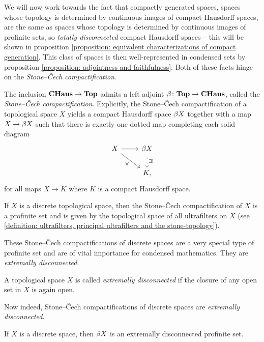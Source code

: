We will now work towards the fact that compactly generated spaces, \ie spaces whose topology is determined by continuous images of compact Hausdorff spaces, are the same as spaces whose topology is determined by continuous images of profinite sets, so \emph{totally disconnected} compact Hausdorff spaces -- this will be shown in proposition \ref{proposition: equivalent characterizations of compact generation}. This class of spaces is then well-represented in condensed sets by proposition \ref{proposition: adjointness and faithfulness}. Both of these facts hinge on the \emph{Stone--\v Cech compactification}.
\begin{proposition}
	\label{proposition: stone-cech compactification}
	
	The inclusion ${{\mathbf{CHaus}}} \to {{\mathbf{Top}}}$ admits a left adjoint ${\beta}\colon {{\mathbf{Top}}} \to {{\mathbf{CHaus}}}$, called the \emph{Stone--\v Cech compactification}. Explicitly, the Stone--\v Cech compactification of a topological space $X$ yields a compact Hausdorff space ${{\beta} X}$ together with a map $X \to {{\beta}X}$ such that there is exactly one dotted map completing each solid diagram
	$$\begin{tikzcd}
		X 	&\stonecech X\\
		&K,		
		\arrow[from=1-1, to=1-2]
		\arrow[from=1-2, to=2-2, "\exists!", dotted]
		\arrow[from=1-1, to=2-2, "\forall", swap]
	\end{tikzcd}$$
	for all maps $X\to K$ where $K$ is a compact Hausdorff space.
	
	If $X$ is a discrete topological space, then the Stone--\v Cech compactification of $X$ is a profinite set and is given by the topological space of all ultrafilters on $X$ (see \ref{definition: ultrafilters, principal ultrafilters and the stone-topology}).
\end{proposition}

These Stone--\v Cech compactifications of discrete spaces are a very special type of profinite set and are of vital importance for condensed mathematics. They are \emph{extremally disconnected}.
\begin{definition}
	A topological space $X$ is called \emph{extremally disconnected} if the closure of any open set in $X$ is again open.
\end{definition}

Now indeed, Stone--\v Cech compactifications of discrete spaces are \emph{extremally disconnected}.
\begin{lemma}
	
	If $X$ is a discrete space, then ${{\beta} X}$ is an extremally disconnected profinite set.
\end{lemma}

